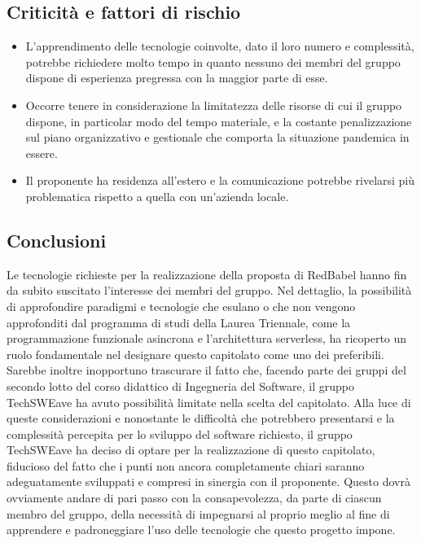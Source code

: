 \subsection{Criticità e fattori di rischio}
\begin{itemize}
    \item L’apprendimento delle tecnologie coinvolte, dato il loro numero e complessità, potrebbe richiedere molto tempo in quanto nessuno dei membri del gruppo dispone di esperienza pregressa con la maggior parte di esse.
    \item Occorre tenere in considerazione la limitatezza delle risorse di cui il gruppo dispone, in particolar modo del tempo materiale, e la costante penalizzazione sul piano organizzativo e gestionale che comporta la situazione pandemica in essere.
    \item Il proponente ha residenza all’estero e la comunicazione potrebbe rivelarsi più problematica rispetto a quella con un’azienda locale.
\end{itemize}
\subsection{Conclusioni}
Le tecnologie richieste per la realizzazione della proposta di RedBabel hanno fin da subito suscitato l’interesse dei membri del gruppo. Nel dettaglio, la possibilità di approfondire paradigmi e tecnologie che esulano o che non vengono approfonditi dal programma di studi della Laurea Triennale, come la programmazione funzionale asincrona e l’architettura serverless, ha ricoperto un ruolo fondamentale nel designare questo capitolato come uno dei preferibili. Sarebbe inoltre inopportuno trascurare il fatto che, facendo parte dei gruppi del secondo lotto del corso didattico di Ingegneria del Software, il gruppo TechSWEave ha avuto possibilità limitate nella scelta del capitolato. Alla luce di queste considerazioni e nonostante le difficoltà che potrebbero presentarsi e la complessità percepita per lo sviluppo del software richiesto, il gruppo TechSWEave ha deciso di optare per la realizzazione di questo capitolato, fiducioso del fatto che i punti non ancora completamente chiari saranno adeguatamente sviluppati e compresi in sinergia con il proponente. Questo dovrà ovviamente andare di pari passo con la consapevolezza, da parte di ciascun membro del gruppo, della necessità di impegnarsi al proprio meglio al fine di apprendere e padroneggiare l’uso delle tecnologie che questo progetto impone.